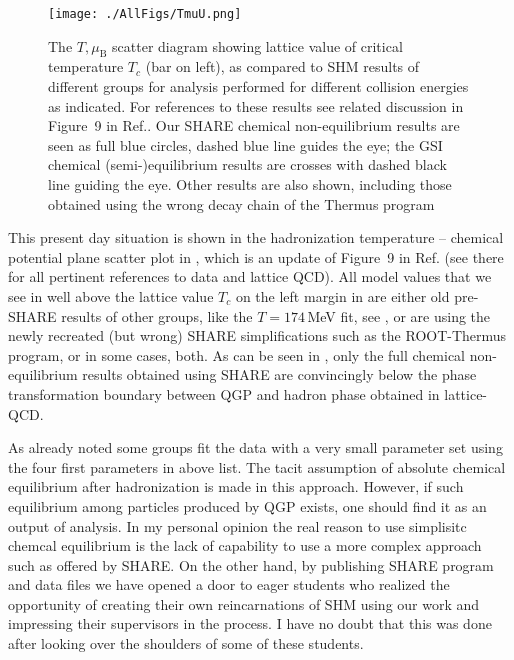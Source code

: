 \begin{figure}[bt]
\centerline{%
\texttt{[image: ./AllFigs/TmuU.png]}
}
\caption{The $T,\mu_\mathrm{B}$ scatter diagram showing lattice value of critical temperature $T_c$ (bar on left), as compared to SHM results of different groups for analysis performed for different collision energies as indicated. For references to these results see related discussion in Figure~9 in Ref.\cite{Rafelski:2015cxa}. Our SHARE chemical non-equilibrium results are seen as full blue circles, dashed blue line guides the eye; the GSI chemical (semi-)equilibrium results are crosses with dashed black line guiding the eye. Other results are also shown, including those obtained using the wrong decay chain of the Thermus program}
\label{TEcol}
\end{figure}

This present day situation is shown in the hadronization temperature -- chemical potential plane scatter plot in , which is an update of Figure~9 in Ref.\cite{Rafelski:2015cxa} (see there for all pertinent references to data and lattice QCD). All model values that we see in  well above the lattice value $T_c$ on the left margin in  are either old pre-SHARE results of other groups, like the $T=174$\,MeV fit, see , or are using the newly recreated (but wrong) SHARE simplifications such as the ROOT-Thermus program, or in some cases, both. As can be seen in , only the full chemical non-equilibrium results obtained using SHARE are convincingly below the phase transformation boundary between QGP and hadron phase obtained in lattice-QCD. 

As already noted some groups fit the data with a very small parameter set using the four first parameters in above list. The tacit assumption of absolute chemical equilibrium after hadronization is made in this approach. However, if such equilibrium among particles produced by QGP exists, one should find it as an output of analysis. In my personal opinion the real reason to use simplisitc chemcal equilibrium is the lack of capability to use a more complex approach such as offered by SHARE. On the other hand, by publishing SHARE program and data files we have opened a  door to eager students who realized the opportunity of creating their own reincarnations of SHM using our work and impressing their supervisors in the process. I have no doubt that this was done after looking over the shoulders of some of these students. 

